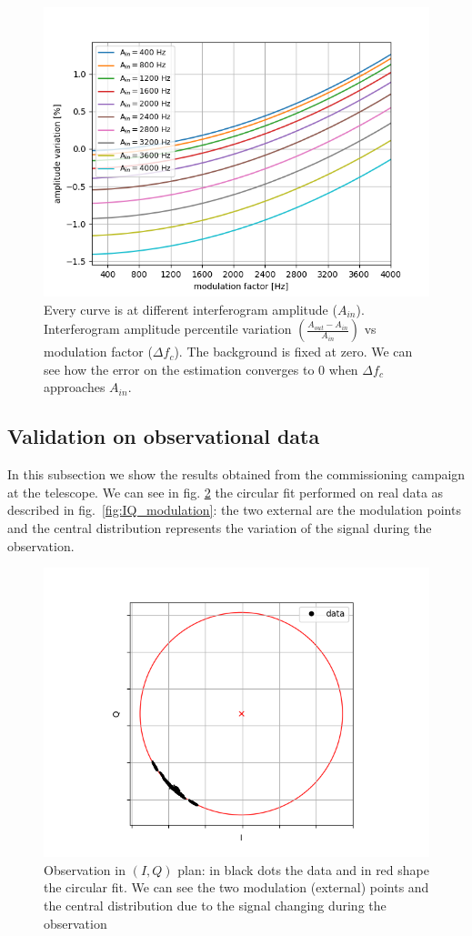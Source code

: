 \documentclass[twocolumn,traditabstract]{aa}\\
\begin{document}
\begin{figure}[htf]
	\centering
 	\includegraphics[width=.5\textwidth]{3.acqui/several_modulations.png}
	\caption{Every curve is at different interferogram amplitude ($A_{in}$). Interferogram amplitude percentile variation $\left( \frac{A_{out}-A_{in}}{A_{in}} \right)$ vs modulation factor ($\Delta f_c$).  The background is fixed at zero. We can see how the error on the estimation converges to 0 when $\Delta f_c$ approaches $A_{in}$. }
	\label{fig:amp_mod}
\end{figure}


\subsection{Validation on observational data}
In this subsection we show the results obtained from the commissioning campaign at the telescope. We can see in fig. \ref{fig:circle} the circular fit performed on real data as described in fig.~\ref{fig:IQ_modulation}: the two external are the modulation points and the central distribution represents the variation of the signal during the observation.


\begin{figure}[htf]
	\centering
	\includegraphics[width=.5\textwidth]{4.results/circular_fit.png}
	\caption{Observation in $(I,Q)$ plan: in black dots the data and in red shape the circular fit. We can see the two modulation (external) points and the central distribution due to the signal changing during the observation}
	\label{fig:circle}
\end{figure}
\end{document}
